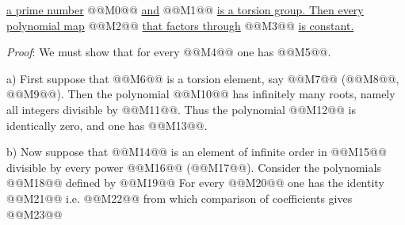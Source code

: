 
\uline{a prime number} @@M0@@ \uline{and} @@M1@@ \uline{is a torsion group. Then every polynomial map} @@M2@@ \uline{that factors through} @@M3@@ \uline{is constant.}

\emph{Proof}: We must show that for every @@M4@@ one has @@M5@@.

a) First suppose that @@M6@@ is a torsion element, say @@M7@@ (@@M8@@, @@M9@@). Then the polynomial @@M10@@ has infinitely many roots, namely all integers divisible by @@M11@@. Thus the polynomial @@M12@@ is identically zero, and one has @@M13@@.

b) Now suppose that @@M14@@ is an element of infinite order in @@M15@@ divisible by every power @@M16@@ (@@M17@@). Consider the polynomials @@M18@@ defined by
@@M19@@
For every @@M20@@ one has the identity
@@M21@@
i.e.
@@M22@@
from which comparison of coefficients gives
@@M23@@

